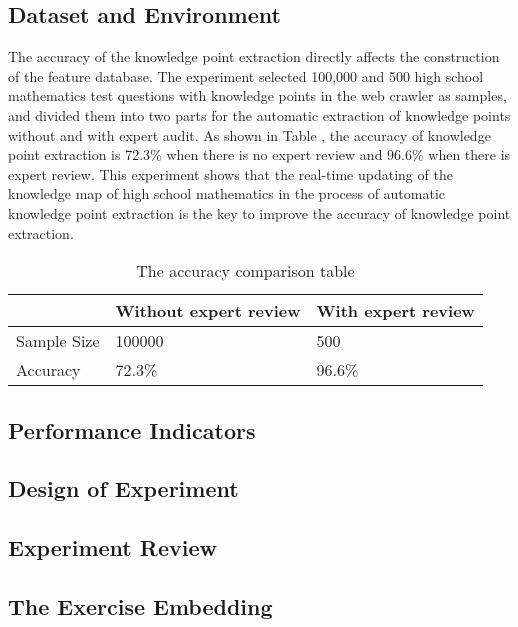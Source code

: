 \subsection{Dataset and Environment}

The accuracy of the knowledge point extraction directly affects the construction of the feature database. The experiment selected 100,000 and 500 high school mathematics test questions with knowledge points in the web crawler as samples, and divided them into two parts for the automatic extraction of knowledge points without and with expert audit. As shown in Table , the accuracy of knowledge point extraction is 72.3\% when there is no expert review and 96.6\% when there is expert review. This experiment shows that the real-time updating of the knowledge map of high school mathematics in the process of automatic knowledge point extraction is the key to improve the accuracy of knowledge point extraction.

\begin{table}[h]
	\centering

	\begin{tabular}{|l|l|l|}
	\hline
				& Without expert review & With expert review \\ \hline
	Sample Size & 100000                & 500                \\ \hline
	Accuracy    & 72.3\%                & 96.6\%             \\ \hline
	\end{tabular}
	\caption{The accuracy comparison table}
\end{table}

\subsection{Performance Indicators}


\subsection{Design of Experiment}

\subsection{Experiment Review}


\subsection{The Exercise Embedding }

